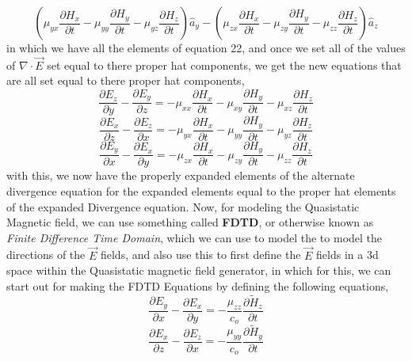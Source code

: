 \documentclass[]{article}
\begin{document}
\[(\mu_{yx}\frac{\partial{H}_x}{\partial{t}} - \mu_{yy}\frac{\partial{H}_y}{\partial{t}} - \mu_{yz}\frac{\partial{H}_z}{\partial{t}})\hat{a}_y - (\mu_{zx}\frac{\partial{H}_x}{\partial{t}} - \mu_{zy}\frac{\partial{H}_y}{\partial{t}} - \mu_{zz}\frac{\partial{H}_z}{\partial{t}})\hat{a}_z\]
in which we have all the elements of equation 22, and once we set all of the values of $\nabla \cdot \vec{E}$ set equal to there proper hat components, we get the new equations that are all set equal to there proper hat components,
\begin{equation}
\frac{\partial{E}_z}{\partial{y}} - \frac{\partial{E}_y}{\partial{z}} = -\mu_{xx}\frac{\partial{H}_x}{\partial{t}} - \mu_{xy}\frac{\partial{H}_y}{\partial{t}} - \mu_{xz}\frac{\partial{H}_z}{\partial{t}} 
\end{equation}
\begin{equation}
\frac{\partial{E}_x}{\partial{z}} - \frac{\partial{E}_z}{\partial{x}} = -\mu_{yx}\frac{\partial{H}_x}{\partial{t}} - \mu_{yy}\frac{\partial{H}_y}{\partial{t}} - \mu_{yz}\frac{\partial{H}_z}{\partial{t}}
\end{equation}
\begin{equation}
\frac{\partial{E}_y}{\partial{x}} - \frac{\partial{E}_x}{\partial{y}} = -\mu_{zx}\frac{\partial{H}_x}{\partial{t}} - \mu_{zy}\frac{\partial{H}_y}{\partial{t}} - \mu_{zz}\frac{\partial{H}_z}{\partial{t}}
\end{equation}
with this, we now have the properly expanded elements of the alternate divergence equation for the expanded elements equal to the proper hat elements of the expanded Divergence equation. Now, for modeling the Quasistatic Magnetic field, we can use something called \textbf{FDTD}, or otherwise known as \textit{Finite Difference Time Domain}, which we can use to model the to model the directions of the $\vec{E}$ fields, and also use this to first define the $\vec{E}$ fields in a 3d space within the Quasistatic magnetic field generator, in which for this, we can start out for making the FDTD Equations by defining the following equations,
\begin{equation}
\frac{\partial{E}_y}{\partial{x}} - \frac{\partial{E}_x}{\partial{y}} = -\frac{\mu_{zz}}{c_{o}} \frac{\partial{\tilde{H}_z}}{\partial{t}}
\end{equation}
\begin{equation}
\frac{\partial{E}_x}{\partial{z}} - \frac{\partial{E}_z}{\partial{x}} = -\frac{\mu_{yy}}{c_{o}} \frac{\partial{\tilde{H}_y}}{\partial{t}}
\end{equation}
\end{document}
